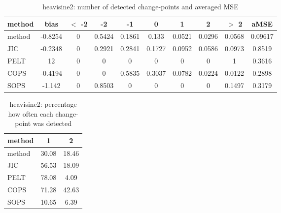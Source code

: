 \begin{table}[ht]
\centering
\begin{tabular}{l|c|ccccccc|c}
  \hline
method & bias & $<$ -2 & -2 & -1 & 0 & 1 & 2 & $>$ 2 & aMSE \\ 
  \hline
method & -0.8254 &     0 & 0.5424 & 0.1861 & 0.133 & 0.0521 & 0.0296 & 0.0568 & 0.09617 \\ 
  JIC & -0.2348 &     0 & 0.2921 & 0.2841 & 0.1727 & 0.0952 & 0.0586 & 0.0973 & 0.8519 \\ 
  PELT &    12 &     0 &     0 &     0 &     0 &     0 &     0 &     1 & 0.3616 \\ 
  COPS & -0.4194 &     0 &     0 & 0.5835 & 0.3037 & 0.0782 & 0.0224 & 0.0122 & 0.2898 \\ 
  SOPS & -1.142 &     0 & 0.8503 &     0 &     0 &     0 &     0 & 0.1497 & 0.3179 \\ 
   \hline
\end{tabular}
\caption{heavisine2: number of detected change-points and averaged MSE} 
\label{tab:heavisine2Njumps}
\end{table}
\begin{table}[ht]
\centering
\begin{tabular}{l|cc}
  \hline
method & 1 & 2 \\ 
  \hline
method &  30.08 &  18.46 \\ 
  JIC &  56.53 &  18.09 \\ 
  PELT &  78.08 &   4.09 \\ 
  COPS &  71.28 &  42.63 \\ 
  SOPS &  10.65 &   6.39 \\ 
   \hline
\end{tabular}
\caption{heavisine2: percentage how often each change-point was detected} 
\label{tab:heavisine2Detections}
\end{table}
